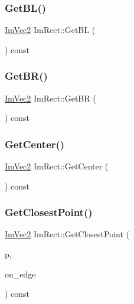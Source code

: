 \subsubsection{\texorpdfstring{Get\+B\+L()}{GetBL()}}
{\footnotesize\ttfamily \mbox{\hyperlink{struct_im_vec2}{Im\+Vec2}} Im\+Rect\+::\+Get\+BL (\begin{DoxyParamCaption}{ }\end{DoxyParamCaption}) const\hspace{0.3cm}{\ttfamily [inline]}}

\mbox{\label{struct_im_rect_ad2f2687254beed5a9b19bde0d6fa14f5}} 
\subsubsection{\texorpdfstring{Get\+B\+R()}{GetBR()}}
{\footnotesize\ttfamily \mbox{\hyperlink{struct_im_vec2}{Im\+Vec2}} Im\+Rect\+::\+Get\+BR (\begin{DoxyParamCaption}{ }\end{DoxyParamCaption}) const\hspace{0.3cm}{\ttfamily [inline]}}

\mbox{\label{struct_im_rect_aae13f8003184fd84f29d27c3c074cf43}} 
\subsubsection{\texorpdfstring{Get\+Center()}{GetCenter()}}
{\footnotesize\ttfamily \mbox{\hyperlink{struct_im_vec2}{Im\+Vec2}} Im\+Rect\+::\+Get\+Center (\begin{DoxyParamCaption}{ }\end{DoxyParamCaption}) const\hspace{0.3cm}{\ttfamily [inline]}}

\mbox{\label{struct_im_rect_a223c67d4c93e5c87a33a68ebb527bbb8}} 
\subsubsection{\texorpdfstring{Get\+Closest\+Point()}{GetClosestPoint()}}
{\footnotesize\ttfamily \mbox{\hyperlink{struct_im_vec2}{Im\+Vec2}} Im\+Rect\+::\+Get\+Closest\+Point (\begin{DoxyParamCaption}\item[{\mbox{\hyperlink{struct_im_vec2}{Im\+Vec2}}}]{p,  }\item[{bool}]{on\+\_\+edge }\end{DoxyParamCaption}) const\hspace{0.3cm}{\ttfamily [inline]}}

